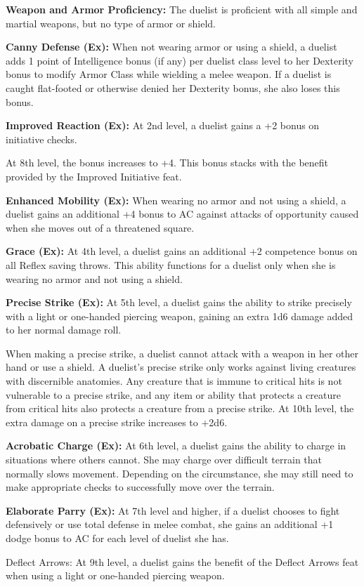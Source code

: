 \ClassFeatures

\textbf{Weapon and Armor Proficiency:} The duelist is proficient with all simple 
and martial weapons, but no type of armor or shield.

\textbf{Canny Defense (Ex):} When not wearing armor or using a shield, a duelist 
adds 1 point of Intelligence bonus (if any) per duelist class level to her Dexterity 
bonus to modify Armor Class while wielding a melee weapon. If a duelist is caught 
flat-footed or otherwise denied her Dexterity bonus, she also loses this bonus.

\textbf{Improved Reaction (Ex):} At 2nd level, a duelist gains a +2 bonus on initiative 
checks.

At 8th level, the bonus increases to +4. This bonus stacks with the benefit provided 
by the Improved Initiative feat.

\textbf{Enhanced Mobility (Ex):} When wearing no armor and not using a shield, 
a duelist gains an additional +4 bonus to AC against attacks of opportunity caused 
when she moves out of a threatened square.

\textbf{Grace (Ex):} At 4th level, a duelist gains an additional +2 competence 
bonus on all Reflex saving throws. This ability functions for a duelist only when 
she is wearing no armor and not using a shield.

\textbf{Precise Strike (Ex):} At 5th level, a duelist gains the ability to strike 
precisely with a light or one-handed piercing weapon, gaining an extra 1d6 damage 
added to her normal damage roll.

When making a precise strike, a duelist cannot attack with a weapon in her other 
hand or use a shield. A duelist's precise strike only works against living creatures 
with discernible anatomies. Any creature that is immune to critical hits is not 
vulnerable to a precise strike, and any item or ability that protects a creature 
from critical hits also protects a creature from a precise strike. At 
10th level, the extra damage on a precise strike increases to +2d6.

\textbf{Acrobatic Charge (Ex):} At 6th level, a duelist gains the ability to charge 
in situations where others cannot. She may charge over difficult terrain that normally 
slows movement. Depending on the circumstance, she may still need to make appropriate 
checks to successfully move over the terrain.

\textbf{Elaborate Parry (Ex):} At 7th level and higher, if a duelist chooses to 
fight defensively or use total defense in melee combat, she gains an additional 
+1 dodge bonus to AC for each level of duelist she has.

Deflect Arrows: At 9th level, a duelist gains the benefit of the Deflect Arrows 
feat when using a light or one-handed piercing weapon.
